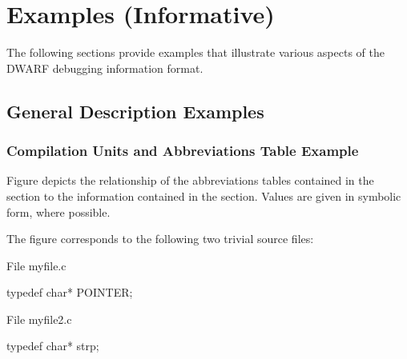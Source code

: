 \chapter{Examples (Informative)}
\label{app:examplesinformative}

The following sections provide examples that illustrate
various aspects of the DWARF debugging information format.


\section{General Description Examples}
\label{app:generaldescriptionexamples}


\subsection{Compilation Units and Abbreviations Table Example}
\label{app:compilationunitsandabbreviationstableexample}

Figure 
depicts the relationship of the abbreviations tables contained
in the \dotdebugabbrev{}
section to the information contained in
the \dotdebuginfo{}
section. Values are given in symbolic form,
where possible.

The figure corresponds to the following two trivial source files:

File myfile.c
\begin{nlnlisting}
typedef char* POINTER;
\end{nlnlisting}
File myfile2.c
\begin{nlnlisting}
typedef char* strp;
\end{nlnlisting}

